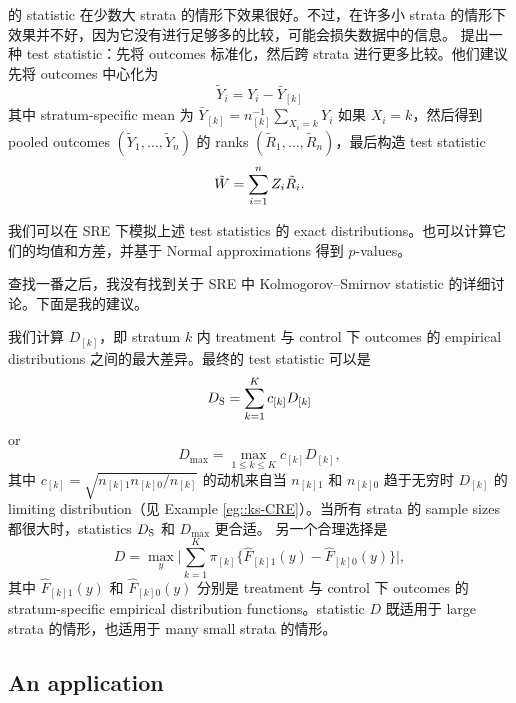  


\begin{example}
\label{eg::hodgeslehmann}
\citet{van1960combination} 的 statistic 在少数大 strata 的情形下效果很好。不过，在许多小 strata 的情形下效果并不好，因为它没有进行足够多的比较，可能会损失数据中的信息。\citet{hodges1962rank} 提出一种 test statistic：先将 outcomes 标准化，然后跨 strata 进行更多比较。他们建议先将 outcomes 中心化为
$$
\tilde{Y}_i = Y_i  - \bar{Y}_{[k]}
$$
其中 stratum-specific mean 为
$
\bar{Y}_{[k]} = n_{[k]}^{-1} \sum_{X_i   = k} Y_i
$
如果 $X_i = k$，然后得到 pooled outcomes $(\tilde{Y}_1, \ldots, \tilde{Y}_n)$ 的 ranks $(\tilde{R}_1, \ldots, \tilde{R}_n)$，最后构造 test statistic
$$
\tilde{W} = \sum_{i=1}^n Z_i \tilde{R}_i.
$$
\end{example}


我们可以在 SRE 下模拟上述 test statistics 的 exact distributions。也可以计算它们的均值和方差，并基于 Normal approximations 得到 $p$-values。


查找一番之后，我没有找到关于 SRE 中 Kolmogorov--Smirnov statistic 的详细讨论。下面是我的建议。


 \begin{example}
\label{eg::ks-stratified}
我们计算 $D_{[k]}$，即 stratum $k$ 内 treatment 与 control 下 outcomes 的 empirical distributions 之间的最大差异。最终的 test statistic 可以是
$$
D_\textsc{S}  = \sum_{k=1}^K    c_{[k]}    D_{[k]}
$$
or 
$$
D_{\max} = \max_{1\leq k \leq K}  c_{[k]}   D_{[k]},
$$ 
其中 $ c_{[k]}   = \sqrt{   n_{[k]1}  n_{[k]0} /  n_{[k]}  }$ 的动机来自当 $n_{[k]1} $ 和 $ n_{[k]0} $ 趋于无穷时 $D_{[k]}$ 的 limiting distribution（见 Example \ref{eg::ks-CRE}）。当所有 strata 的 sample sizes 都很大时，statistics $D_\textsc{S} $ 和 $D_{\max} $ 更合适。
另一个合理选择是
$$
D =  \max_y \Big |  \sum_{k=1}^K  \pi_{[k]}  \{  \hat{F}_{[k]1}(y)  - \hat{F}_{[k]0}(y) \}   \Big | ,
$$
其中 $\hat{F}_{[k]1}(y)  $ 和 $ \hat{F}_{[k]0}(y)$ 分别是 treatment 与 control 下 outcomes 的 stratum-specific empirical distribution functions。statistic $D$ 既适用于 large strata 的情形，也适用于 many small strata 的情形。
\end{example}
 
 
 
 \subsection{An application}
 \label{sec::frt-pennbonus}
 
